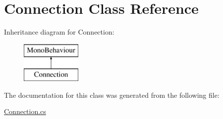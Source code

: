 \hypertarget{class_connection}{}\section{Connection Class Reference}
\label{class_connection}
Inheritance diagram for Connection\+:\begin{figure}[H]
\begin{center}
\leavevmode
\includegraphics[height=2.000000cm]{class_connection}
\end{center}
\end{figure}


The documentation for this class was generated from the following file\+:\begin{DoxyCompactItemize}
\item 
\hyperlink{_connection_8cs}{Connection.\+cs}\end{DoxyCompactItemize}
